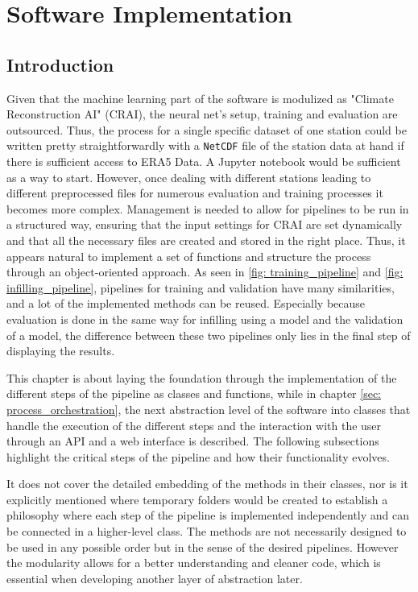 \section{Software Implementation}
\label{sec: implementation}

\newcommand{\code}[1]{\texttt{#1}}

\subsection{Introduction}
\label{sec: implementation_introduction}

Given that the machine learning part of the software is modulized as "Climate Reconstruction AI" (CRAI), the neural net's setup, training and evaluation are outsourced.
Thus, the process for a single specific dataset of one station could be written pretty straightforwardly with a \code{NetCDF} file of the station data at hand if there is sufficient access to ERA5 Data.
A Jupyter notebook would be sufficient as a way to start.
However, once dealing with different stations leading to different preprocessed files for numerous evaluation and training processes it becomes more complex.
Management is needed to allow for pipelines to be run in a structured way, ensuring that the input settings for CRAI are set dynamically and that all the necessary files are created and stored in the right place.
Thus, it appears natural to implement a set of functions and structure the process through an object-oriented approach.
As seen in \autoref{fig: training_pipeline} and \autoref{fig: infilling_pipeline}, pipelines for training and validation have many similarities, and a lot of the implemented methods can be reused. Especially because evaluation is done in the same way for infilling using a model and the validation of a model, the difference between these two pipelines only lies in the final step of displaying the results.

This chapter is about laying the foundation through the implementation of the different steps of the pipeline as classes and functions,
while in chapter \autoref{sec: process_orchestration}, the next abstraction level of the software into classes that handle the execution of the different steps and the interaction with the user through an API and a web interface is described.
The following subsections highlight the critical steps of the pipeline and how their functionality evolves.

It does not cover the detailed embedding of the methods in their classes, nor is it explicitly mentioned where temporary folders would be created to establish a philosophy where each step of the pipeline is implemented independently and can be connected in a higher-level class.
The methods are not necessarily designed to be used in any possible order but in the sense of the desired pipelines. However the modularity allows for a better understanding and cleaner code, which is essential when developing another layer of abstraction later.

